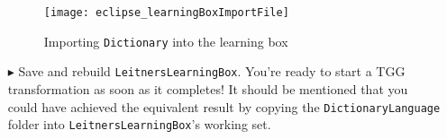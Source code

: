 \begin{itemize}
\begin{figure}[htbp]
\begin{center}
  \texttt{[image: eclipse\_learningBoxImportFile]}
  \caption{Importing \texttt{Dictionary} into the learning box}
  \label{eclipse:importConfigFile}
\end{center}
\end{figure}

\vspace{1cm}

\item[$\blacktriangleright$] Save and rebuild \texttt{LeitnersLearningBox}. You're ready to start a TGG transformation as soon as it completes! It should be
mentioned that you could have achieved the equivalent result by copying the \texttt{DictionaryLanguage} folder into \texttt{LeitnersLearningBox}'s working set.

\end{itemize}
